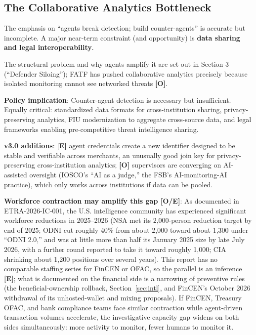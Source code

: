 \documentclass[11pt,letterpaper]{article}
\begin{document}
\subsection{The Collaborative Analytics Bottleneck}

\begin{criticalbox}
The emphasis on ``agents break detection; build counter-agents'' is accurate but incomplete. A major near-term constraint (and opportunity) is \textbf{data sharing and legal interoperability}.

The structural problem and why agents amplify it are set out in Section 3 (``Defender Siloing''); FATF has pushed collaborative analytics precisely because isolated monitoring cannot see networked threats \textbf{[O]}.

\textbf{Policy implication}: Counter-agent detection is necessary but insufficient. Equally critical: standardized data formats for cross-institution sharing, privacy-preserving analytics, FIU modernization to aggregate cross-source data, and legal frameworks enabling pre-competitive threat intelligence sharing.

\textbf{v3.0 additions}: \textbf{[E]} agent credentials create a new identifier designed to be stable and verifiable across merchants, an unusually good join key for privacy-preserving cross-institution analytics; \textbf{[O]} supervisors are converging on AI-assisted oversight (IOSCO's ``AI as a judge,'' the FSB's AI-monitoring-AI practice), which only works across institutions if data can be pooled.

\textbf{Workforce contraction may amplify this gap [O/E]}: As documented in ETRA-2026-IC-001, the U.S. intelligence community has experienced significant workforce reductions in 2025--2026 (NSA met its 2,000-person reduction target by end of 2025; ODNI cut roughly 40\% from about 2,000 toward about 1,300 under ``ODNI 2.0,'' and was at little more than half its January 2025 size by late July 2026, with a further round reported to take it toward roughly 1,000; CIA shrinking about 1,200 positions over several years). This report has no comparable staffing series for FinCEN or OFAC, so the parallel is an inference \textbf{[E]}; what is documented on the financial side is a narrowing of preventive rules (the beneficial-ownership rollback, Section~\ref{sec:intl}, and FinCEN's October 2026 withdrawal of its unhosted-wallet and mixing proposals). If FinCEN, Treasury OFAC, and bank compliance teams face similar contraction while agent-driven transaction volumes accelerate, the investigative capacity gap widens on both sides simultaneously: more activity to monitor, fewer humans to monitor it.
\end{criticalbox}
\end{document}

